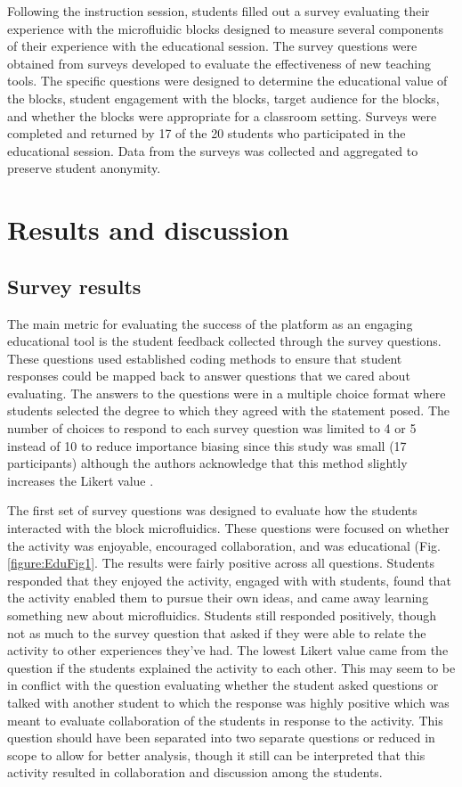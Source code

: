 Following the instruction session, students filled out a survey evaluating their experience with the microfluidic blocks designed to measure several components of their experience with the educational session. The survey questions were obtained from surveys developed to evaluate the effectiveness of new teaching tools. The specific questions were designed to determine the educational value of the blocks, student engagement with the blocks, target audience for the blocks, and whether the blocks were appropriate for a classroom setting. Surveys were completed and returned by 17 of the 20 students who participated in the educational session. Data from the surveys was collected and aggregated to preserve student anonymity.

\section{Results and discussion}

\subsection{Survey results}
The main metric for evaluating the success of the platform as an engaging educational tool is the student feedback collected through the survey questions. These questions used established coding methods to ensure that student responses could be mapped back to answer questions that we cared about evaluating. The answers to the questions were in a multiple choice format where students selected the degree to which they agreed with the statement posed. The number of choices to respond to each survey question was limited to 4 or 5 instead of 10 to reduce importance biasing since this study was small (17 participants) although the authors acknowledge that this method slightly increases the Likert value \cite{ISI:000252619600006}.

The first set of survey questions was designed to evaluate how the students interacted with the block microfluidics. These questions were focused on whether the activity was enjoyable, encouraged collaboration, and was educational (Fig. \ref{figure:EduFig1}. The results were fairly positive across all questions. Students responded that they enjoyed the activity, engaged with with students, found that the activity enabled them to pursue their own ideas, and came away learning something new about microfluidics. Students still responded positively, though not as much to the survey question that asked if they were able to relate the activity to other experiences they've had. The lowest Likert value came from the question if the students explained the activity to each other. This may seem to be in conflict with the question evaluating whether the student asked questions or talked with another student to which the response was highly positive which was meant to evaluate collaboration of the students in response to the activity. This question should have been separated into two separate questions or reduced in scope to allow for better analysis, though it still can be interpreted that this activity resulted in collaboration and discussion among the students. 

